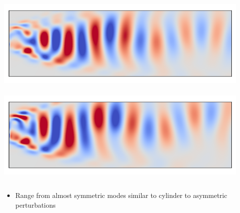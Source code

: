 \documentclass[9pt]{beamer}
\begin{document}
\begin{frame}
\begin{columns}[c]
\\\vspace{-0.07cm}\includegraphics[width=0.95\textwidth]{POD4CompareInterp2} \\
\\\vspace{-0.07cm}\includegraphics[width=0.95\textwidth]{POD4CompareInterp4}
\end{columns}
\begin{itemize}
\item Range from almost symmetric modes similar to cylinder to asymmetric perturbations
\end{itemize}
\end{frame}
\end{document}
